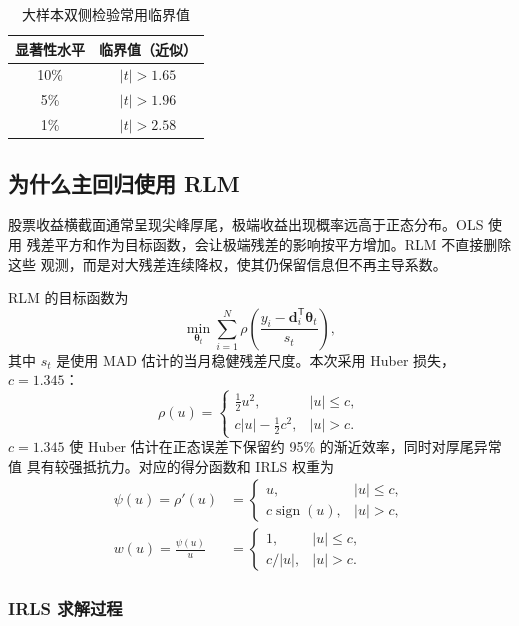 \documentclass[UTF8,a4paper,11pt]{ctexart}
\begin{document}
\begin{table}[H]
  \centering
  \caption{大样本双侧检验常用临界值}
  \begin{tabular}{cc}
    \toprule
    显著性水平 & 临界值（近似） \\
    \midrule
    10\% & $|t|>1.65$ \\
    5\%  & $|t|>1.96$ \\
    1\%  & $|t|>2.58$ \\
    \bottomrule
  \end{tabular}
\end{table}

\subsection{为什么主回归使用 RLM}

股票收益横截面通常呈现尖峰厚尾，极端收益出现概率远高于正态分布。OLS 使用
残差平方和作为目标函数，会让极端残差的影响按平方增加。RLM 不直接删除这些
观测，而是对大残差连续降权，使其仍保留信息但不再主导系数。

RLM 的目标函数为
\begin{equation}
  \min_{\bm{\theta}_t}
  \sum_{i=1}^{N}
  \rho\!\left(
  \frac{y_i-\bm{d}_i^{\mathsf T}\bm{\theta}_t}{s_t}
  \right),
\end{equation}
其中 $s_t$ 是使用 MAD 估计的当月稳健残差尺度。本次采用 Huber 损失，
$c=1.345$：
\begin{equation}
\rho(u)=
\begin{cases}
  \frac{1}{2}u^2, & |u|\leq c,\\
  c|u|-\frac{1}{2}c^2, & |u|>c.
\end{cases}
\end{equation}
$c=1.345$ 使 Huber 估计在正态误差下保留约 95\% 的渐近效率，同时对厚尾异常值
具有较强抵抗力。对应的得分函数和 IRLS 权重为
\begin{align}
  \psi(u)=\rho'(u)
  &=\begin{cases}
      u,&|u|\leq c,\\
      c\operatorname{sign}(u),&|u|>c,
    \end{cases}\\
  w(u)=\frac{\psi(u)}{u}
  &=\begin{cases}
      1,&|u|\leq c,\\
      c/|u|,&|u|>c.
    \end{cases}
\end{align}

\subsubsection{IRLS 求解过程}
\end{document}
